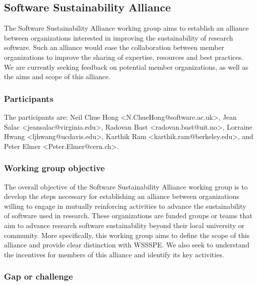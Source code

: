 \subsection{Software Sustainability Alliance}
\label{sec:alliance}


The Software Sustainability Alliance working group aims to establish an alliance between organizations interested in improving the sustainability of research software. Such an alliance would ease the collaboration between member organizations to improve the sharing of expertise, resources and best practices. We are currently seeking feedback on potential member organizations, as well as the aims and scope of this alliance.

\subsubsection{Participants}

The participants are:
Neil Chue Hong <N.ChueHong@software.ac.uk>,
Jean Salac <jeansalac@virginia.edu>,
Radovan Bast <radovan.bast@uit.no>,
Lorraine Hwang <ljhwang@ucdavis.edu>,
Karthik Ram <karthik.ram@berkeley.edu>,
and
Peter Elmer <Peter.Elmer@cern.ch>.

\subsubsection{Working group objective}

The overall objective of the Software Sustainability Alliance working group is to develop the steps necessary for establishing an alliance between organizations willing to engage in mutually reinforcing activities to advance the sustainability of software used in research. These organizations are funded groups or teams that aim to advance research software sustainability beyond their local university or community. More specifically, this working group aims to define the scope of this alliance and provide clear distinction with WSSSPE. We also seek to understand the incentives for members of this alliance and identify its key activities.

\subsubsection{Gap or challenge}

